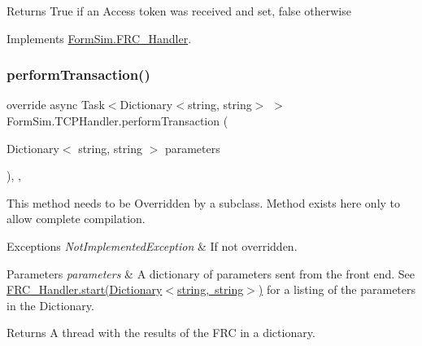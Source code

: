 \begin{DoxyReturn}{Returns}
True if an Access token was received and set, false otherwise
\end{DoxyReturn}


Implements \mbox{\hyperlink{interface_form_sim_1_1_f_r_c___handler_a32c299d3cb3cdd6c444e76b3671af1b4}{Form\+Sim.\+F\+R\+C\+\_\+\+Handler}}.

\mbox{\label{class_form_sim_1_1_t_c_p_handler_a7762d051722dd2ac8bee1c26043760f3}} 
\subsubsection{\texorpdfstring{perform\+Transaction()}{performTransaction()}}
{\footnotesize\ttfamily override async Task$<$Dictionary$<$string, string$>$ $>$ Form\+Sim.\+T\+C\+P\+Handler.\+perform\+Transaction (\begin{DoxyParamCaption}\item[{Dictionary$<$ string, string $>$}]{parameters }\end{DoxyParamCaption})\hspace{0.3cm}{\ttfamily [inline]}, {\ttfamily [protected]}, {\ttfamily [virtual]}}



This method needs to be Overridden by a subclass. Method exists here only to allow complete compilation. 


\begin{DoxyExceptions}{Exceptions}
{\em Not\+Implemented\+Exception} & If not overridden.\\
\hline
\end{DoxyExceptions}

\begin{DoxyParams}{Parameters}
{\em parameters} & A dictionary of parameters sent from the front end. See \mbox{\hyperlink{interface_form_sim_1_1_f_r_c___handler_a2a2a8a776e774e5f8b5e2b7e623a26a6}{F\+R\+C\+\_\+\+Handler.\+start(\+Dictionary$<$string, string$>$)}} for a listing of the parameters in the Dictionary.\\
\hline
\end{DoxyParams}
\begin{DoxyReturn}{Returns}
A thread with the results of the F\+RC in a dictionary.
\end{DoxyReturn}


